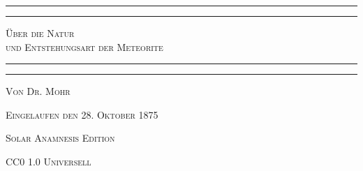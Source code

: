 \documentclass[a4paper, 11pt, oneside, german]{article}
\begin{document}
\begin{titlepage} %
	\centering %

	
	\rule{\textwidth}{1.6pt}\vspace*{-\baselineskip}\vspace*{2pt} %
	\rule{\textwidth}{0.4pt} %
	
	\vspace{1\baselineskip} %
	
	{\scshape\LARGE Über die Natur\\ und Entstehungsart der Meteorite\\[1.25pt]}
	
	\vspace{1\baselineskip} %

	\rule{\textwidth}{0.4pt}\vspace*{-\baselineskip}\vspace{3.2pt} %
	\rule{\textwidth}{1.6pt} %
	
	\vspace{1\baselineskip} %
	
	
	{\scshape\small Von \large Dr. Mohr} %
    	
    \vspace*{\fill}

	\vspace{1\baselineskip}

	{\small\scshape Eingelaufen den 28. Oktober 1875}
		
	\vspace{0.5\baselineskip} %

    {\scshape Solar Anamnesis Edition}  %
	
	{\scshape\small CC0 1.0 Universell} %
\end{titlepage}
\setlength{\parskip}{1mm plus1mm minus1mm}
\clearpage
\end{document}
